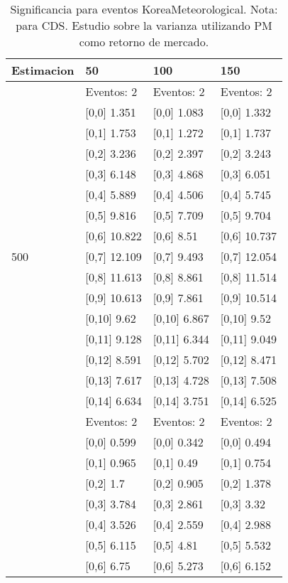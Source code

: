\begin{table}

\caption{Significancia para eventos KoreaMeteorological. Nota: para CDS. Estudio sobre la varianza utilizando PM como retorno de mercado.}
\centering
\begin{tabular}[t]{llll}
\toprule
Estimacion & 50 & 100 & 150\\
\midrule
 & Eventos:  2 & Eventos:  2 & Eventos:  2\\
 & {}[0,0] 1.351 & {}[0,0] 1.083 & {}[0,0] 1.332\\
 & {}[0,1] 1.753 & {}[0,1] 1.272 & {}[0,1] 1.737\\
 & {}[0,2] 3.236 & {}[0,2] 2.397 & {}[0,2] 3.243\\
 & {}[0,3] 6.148 & {}[0,3] 4.868 & {}[0,3] 6.051\\
\addlinespace
 & {}[0,4] 5.889 & {}[0,4] 4.506 & {}[0,4] 5.745\\
 & {}[0,5] 9.816 & {}[0,5] 7.709 & {}[0,5] 9.704\\
 & {}[0,6] 10.822 & {}[0,6] 8.51 & {}[0,6] 10.737\\
500 & {}[0,7] 12.109 & {}[0,7] 9.493 & {}[0,7] 12.054\\
 & {}[0,8] 11.613 & {}[0,8] 8.861 & {}[0,8] 11.514\\
\addlinespace
 & {}[0,9] 10.613 & {}[0,9] 7.861 & {}[0,9] 10.514\\
 & {}[0,10] 9.62 & {}[0,10] 6.867 & {}[0,10] 9.52\\
 & {}[0,11] 9.128 & {}[0,11] 6.344 & {}[0,11] 9.049\\
 & {}[0,12] 8.591 & {}[0,12] 5.702 & {}[0,12] 8.471\\
 & {}[0,13] 7.617 & {}[0,13] 4.728 & {}[0,13] 7.508\\
\addlinespace
 & {}[0,14] 6.634 & {}[0,14] 3.751 & {}[0,14] 6.525\\
 & Eventos:  2 & Eventos:  2 & Eventos:  2\\
 & {}[0,0] 0.599 & {}[0,0] 0.342 & {}[0,0] 0.494\\
 & {}[0,1] 0.965 & {}[0,1] 0.49 & {}[0,1] 0.754\\
 & {}[0,2] 1.7 & {}[0,2] 0.905 & {}[0,2] 1.378\\
\addlinespace
 & {}[0,3] 3.784 & {}[0,3] 2.861 & {}[0,3] 3.32\\
 & {}[0,4] 3.526 & {}[0,4] 2.559 & {}[0,4] 2.988\\
 & {}[0,5] 6.115 & {}[0,5] 4.81 & {}[0,5] 5.532\\
 & {}[0,6] 6.75 & {}[0,6] 5.273 & {}[0,6] 6.152\\

\end{tabular}
\end{table}
